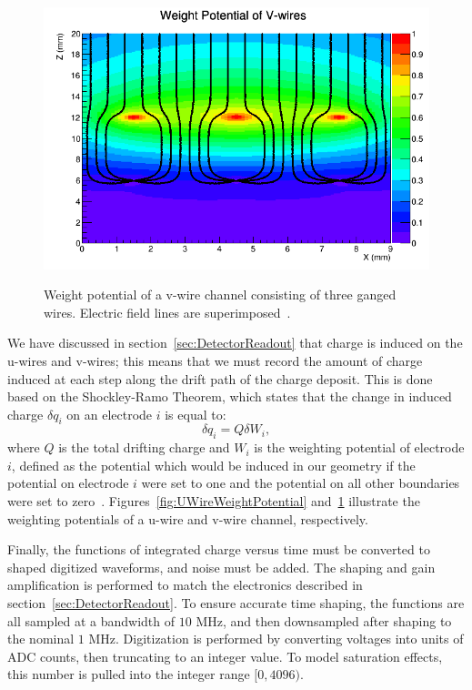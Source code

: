 \begin{figure}
\begin{center}
\includegraphics[keepaspectratio=true,width=\textwidth]{WeightPotContoursV_WithE.png}
\end{center}
\renewcommand{\baselinestretch}{1}
\small\normalsize
\begin{quote}
\caption{Weight potential of a v-wire channel consisting of three ganged wires.  Electric field lines are superimposed~\cite{MCDocumentRun2a}.}
\label{fig:VWireWeightPotential}
\end{quote}
\end{figure}
\renewcommand{\baselinestretch}{2}
\small\normalsize

We have discussed in section~\ref{sec:DetectorReadout} that charge is induced on the u-wires and v-wires; this means that we must record the amount of charge induced at each step along the drift path of the charge deposit.  This is done based on the Shockley-Ramo Theorem, which states that the change in induced charge $\delta q_i$ on an electrode $i$ is equal to:
\begin{equation}
\delta q_i = Q \delta W_i,
\end{equation}
where $Q$ is the total drifting charge and $W_i$ is the weighting potential of electrode $i$, defined as the potential which would be induced in our geometry if the potential on electrode $i$ were set to one and the potential on all other boundaries were set to zero~\cite{ShockleyPaper,1686997}.  Figures~\ref{fig:UWireWeightPotential} and~\ref{fig:VWireWeightPotential} illustrate the weighting potentials of a u-wire and v-wire channel, respectively.

Finally, the functions of integrated charge versus time must be converted to shaped digitized waveforms, and noise must be added.  The shaping and gain amplification is performed to match the electronics described in section~\ref{sec:DetectorReadout}.  To ensure accurate time shaping, the functions are all sampled at a bandwidth of $10$ MHz, and then downsampled after shaping to the nominal $1$ MHz.  Digitization is performed by converting voltages into units of ADC counts, then truncating to an integer value.  To model saturation effects, this number is pulled into the integer range $[0, 4096)$.

